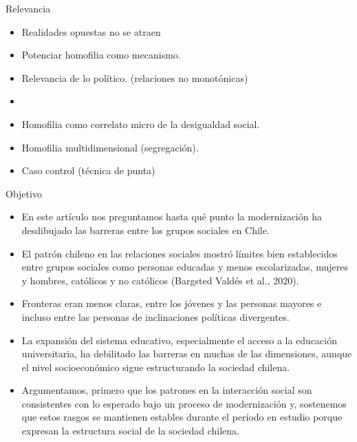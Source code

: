 \documentclass[
  8pt,
  ignorenonframetext,
]{beamer}
\begin{document}
\begin{frame}{Relevancia}
\protect\hypertarget{relevancia}{}
\begin{itemize}
\item
  Realidades opuestas no se atraen
\item
  Potenciar homofilia como mecanismo.
\item
  Relevancia de lo político. (relaciones no monotónicas)
\item
\item
  Homofilia como correlato micro de la desigualdad social.
\item
  Homofilia multidimensional (segregación).
\item
  Caso control (técnica de punta)
\end{itemize}
\end{frame}

\begin{frame}{Objetivo}
\protect\hypertarget{objetivo}{}
\begin{itemize}
\item
  En este artículo nos preguntamos hasta qué punto la modernización ha
  desdibujado las barreras entre los grupos sociales en Chile.
\item
  El patrón chileno en las relaciones sociales mostró límites bien
  establecidos entre grupos sociales como personas educadas y menos
  escolarizadas, mujeres y hombres, católicos y no católicos (Bargsted
  Valdés et al., 2020).
\item
  Fronteras eran menos claras, entre los jóvenes y las personas mayores
  e incluso entre las personas de inclinaciones políticas divergentes.
\item
  La expansión del sistema educativo, especialmente el acceso a la
  educación universitaria, ha debilitado las barreras en muchas de las
  dimensiones, aunque el nivel socioeconómico sigue estructurando la
  sociedad chilena.
\item
  Argumentamos, primero que los patrones en la interacción social son
  consistentes con lo esperado bajo un proceso de modernización y,
  sostenemos que estos rasgos se mantienen estables durante el período
  en estudio porque expresan la estructura social de la sociedad
  chilena.
\end{itemize}
\end{frame}
\end{document}
